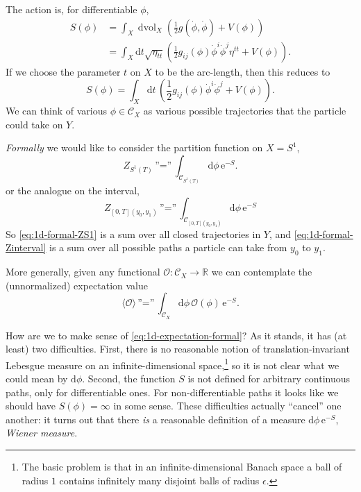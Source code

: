 \documentclass[12pt,letterpaper,reqno]{article}
\numberwithin{equation}{section}
\newcommand{\cC}{\ensuremath{\mathcal C}}
\newcommand{\cO}{\ensuremath{\mathcal O}}
\newcommand{\R}{\ensuremath{\mathbb R}}
\newcommand{\half}{\ensuremath{\frac{1}{2}}}
\newcommand{\e}{{\mathrm e}}
\newcommand{\de}{\mathrm{d}}
\newcommand{\IP}[1]{\langle#1\rangle}
\newcommand{\eps}{\epsilon}
\newcommand{\ti}[1]{\textit{#1}}
\DeclareMathOperator{\dvol}{dvol}
\newcommand{\insfig}[2]{

\medskip
\noindent
\begin{minipage}{\linewidth}
\makebox[\linewidth]{\texttt{[image: figures/\#1-crop.pdf]}}
\end{minipage}
\noindent}
\begin{document}
The action is, for differentiable $\phi$,
\begin{align}
  S(\phi) &= \int_X \dvol_X \left(\half g(\dot\phi,\dot\phi) + V(\phi)\right) \\
  &= \int_X \de t \sqrt{\eta_{tt}} \left(\half g_{ij}(\phi) \dot\phi^i \dot\phi^j \eta^{tt} + V(\phi)\right).
\end{align}
If we choose the parameter $t$ on $X$ to be the arc-length, then
this reduces to
\begin{equation}
    S(\phi) = \int_X \de t \, \left( \half g_{ij}(\phi) \dot\phi^i \dot\phi^j + V(\phi) \right).
\end{equation}
We can think of various $\phi \in \cC_X$ as various possible
trajectories that the particle could take on $Y$.

\ti{Formally} we would like to consider the partition function on $X = S^1$,
\begin{equation} \label{eq:1d-formal-ZS1}
  Z_{S^1(T)} \, \text{''=''} \, \int_{\cC_{S^1(T)}} \de \phi \, \e^{-S}.
\end{equation}
or the analogue on the interval,
\begin{equation} \label{eq:1d-formal-Zinterval}
  Z_{[0,T](y_0, y_1)} \, \text{''=''} \, \int_{\cC_{[0,T](y_0,y_1)}} \de \phi \, \e^{-S}
\end{equation}
So \eqref{eq:1d-formal-ZS1} is a sum over all
closed trajectories in $Y$, and \eqref{eq:1d-formal-Zinterval} 
is a sum over all possible paths
a particle can take from $y_0$ to $y_1$.
\insfig{qft-geometry-16}{0.8}
More generally, given any functional $\cO: \cC_X \to \R$
we can contemplate the (unnormalized) expectation value
\begin{equation} \label{eq:1d-expectation-formal}
  \IP{\cO} \, \text{''=''} \, \int_{\cC_{X}} \de \phi \, \cO(\phi) \, \e^{-S}.
\end{equation}

How are we to make sense of \eqref{eq:1d-expectation-formal}?
As it stands, it has (at least) two difficulties.
First, there is no reasonable notion of translation-invariant Lebesgue measure on 
an infinite-dimensional space,\footnote{The basic problem is that in an 
infinite-dimensional Banach space a ball of radius $1$
contains infinitely many disjoint balls of radius $\eps$.} 
so it is not clear what we could mean by
$\de \phi$. Second, the function $S$ is not defined for arbitrary continuous
paths, only for differentiable ones. For non-differentiable paths it looks
like we should have $S(\phi) = \infty$ in some sense. 
These difficulties actually ``cancel'' one another:
it turns out that there \ti{is} a reasonable definition of a measure
$\de \phi \, \e^{-S}$, \ti{Wiener measure}.
\end{document}
